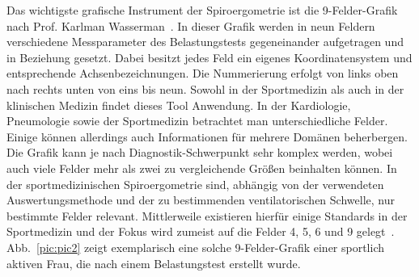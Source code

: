 Das wichtigste grafische Instrument der Spiroergometrie ist die 9-Felder-Grafik nach Prof. Karlman Wasserman~\cite{Wasserman.2012}. In dieser Grafik werden in neun Feldern verschiedene Messparameter des Belastungstests gegeneinander aufgetragen und in Beziehung gesetzt. Dabei besitzt jedes Feld ein eigenes Koordinatensystem und entsprechende Achsenbezeichnungen. Die Nummerierung erfolgt von links oben nach rechts unten von eins bis neun. Sowohl in der Sportmedizin als auch in der klinischen Medizin findet dieses Tool Anwendung. In der Kardiologie, Pneumologie sowie der Sportmedizin betrachtet man unterschiedliche Felder. Einige können allerdings auch Informationen für mehrere Domänen beherbergen. Die Grafik kann je nach Diagnostik-Schwerpunkt sehr komplex werden, wobei auch viele Felder mehr als zwei zu vergleichende Größen beinhalten können. In der sportmedizinischen Spiroergometrie sind, abhängig von der verwendeten Auswertungsmethode und der zu bestimmenden ventilatorischen Schwelle, nur bestimmte Felder relevant. Mittlerweile existieren hierfür einige Standards in der Sportmedizin und der Fokus wird zumeist auf die Felder 4, 5, 6 und 9 gelegt~\cite{ScharhagRosenberger.2013}. Abb.~\ref{pic:pic2} zeigt exemplarisch eine solche 9-Felder-Grafik einer sportlich aktiven Frau, die nach einem Belastungstest erstellt wurde.

